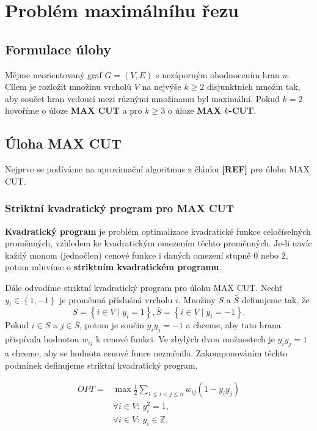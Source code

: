 \chapter{Problém maximálníhu řezu}

\section{Formulace úlohy}

Mějme neorientovaný graf $G = (V, E)$ s nezáporným ohodnocením hran $w$. Cílem je rozložit množinu vrcholů $V$ na nejvýše $k \geq 2$ disjunktních množin tak, aby součet hran vedoucí mezi různými množinamu byl maximální. Pokud $k = 2$ hovoříme o úloze \textbf{MAX CUT} a pro $k \geq 3$ o úloze \textbf{MAX $k$-CUT}.

\section{Úloha MAX CUT}

Nejprve se podíváme na aproximační algoritmus z článku \textbf{[REF]} pro úlohu MAX CUT.

\subsection*{Striktní kvadratický program pro MAX CUT}

\textbf{Kvadratický program} je problém optimalizace kvadratické funkce celočíselných proměnných, vzhledem ke kvadratickým omezením těchto proměnných. Je-li navíc každý monom (jednočlen) cenové funkce i daných omezení stupně $0$ nebo $2$, potom mluvíme o \textbf{striktním kvadratickém programu}.

Dále odvodíme striktní kvadratický program pro úlohu MAX CUT. Nechť $y_i \in \left\{ 1, -1 \right\}$ je proměnná příslušná vrcholu $i$. Množiny $S$ a $\bar{S}$ definujeme tak, že
$$
    S = \left\{ i \in V \mid y_i = 1 \right\}, \bar{S} = \left\{ i \in V \mid y_i = -1 \right\}.
$$
Pokud $i \in S$ a $j \in \bar{S}$, potom je součin $y_i y_j = -1$ a chceme, aby tato hrana přispívala hodnotou $w_{ij}$ k cenové funkci. Ve zbylých dvou možnostech je $y_i y_j = 1$ a chceme, aby se hodnota cenové funce nezměnila. Zakomponováním těchto podmínek definujeme striktní kvadratický program.

\begin{equation}\tag{SQ-MAX-CUT}
    \begin{split}
        OPT = &\max \frac{1}{2} \sum_{1 \leq i < j \leq n} w_{ij} (1 - y_i y_j) \\
        &\forall i \in V:\ y_i^2 = 1, \\
        &\forall i \in V:\ y_i \in \mathbb{Z}.
    \end{split}
    \label{eq:SQ-MAX-CUT}
\end{equation}


